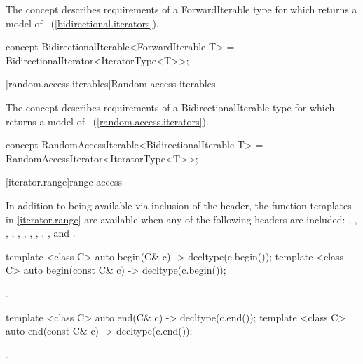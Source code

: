 \begin{addedblock}
\pnum
The  concept describes requirements of a
ForwardIterable type for which  returns a model of
~(\ref{bidirectional.iterators}).

\begin{codeblock}
concept BidirectionalIterable<ForwardIterable T> =
    BidirectionalIterator<IteratorType<T>>;
\end{codeblock}

[random.access.iterables]{Random access iterables}

\pnum
The  concept describes requirements of a
BidirectionalIterable type for which  returns a model of
~(\ref{random.access.iterators}).

\begin{codeblock}
concept RandomAccessIterable<BidirectionalIterable T> =
    RandomAccessIterator<IteratorType<T>>;
\end{codeblock}

\end{addedblock}

[iterator.range]{range access}

\pnum
In addition to being available via inclusion of the  header,
the function templates in \ref{iterator.range} are available when any of the following
headers are included: , , ,
, , , , ,
, , and .

%
\begin{itemdecl}
template <class C> auto begin(C& c) -> decltype(c.begin());
template <class C> auto begin(const C& c) -> decltype(c.begin());
\end{itemdecl}

\begin{itemdescr}
\pnum
\returns {}.
\end{itemdescr}

%
\begin{itemdecl}
template <class C> auto end(C& c) -> decltype(c.end());
template <class C> auto end(const C& c) -> decltype(c.end());
\end{itemdecl}

\begin{itemdescr}
\pnum
\returns {}.
\end{itemdescr}


